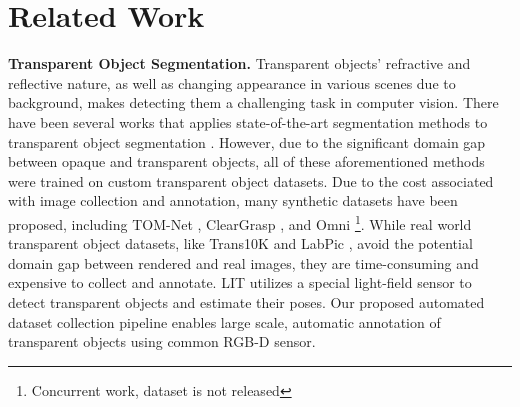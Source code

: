 \documentclass{article}
\begin{document}
\section{Related Work}
\textbf{Transparent Object Segmentation.} Transparent objects' refractive and reflective nature, as well as changing appearance in various scenes due to background, makes detecting them a challenging task in computer vision. There have been several works that applies state-of-the-art segmentation methods \citep{he2018mask,chen2017rethinking,carion2020endtoend} to transparent object segmentation \citep{LabPic, ClearGrasp, xie2021segmenting}. However, due to the significant domain gap between opaque and transparent objects, all of these aforementioned methods were trained on custom transparent object datasets. Due to the cost associated with image collection and annotation, many synthetic datasets have been proposed, including TOM-Net \citep{chen2018tomnet}, ClearGrasp \citep{ClearGrasp}, and Omni \citep{zhu2021rgbd}\footnote{Concurrent work, dataset is not released}. While real world transparent object datasets, like Trans10K \citep{xie2021segmenting} and LabPic \citep{LabPic}, avoid the potential domain gap between rendered and real images, they are time-consuming and expensive to collect and annotate. LIT \citep{zhou2020lit} utilizes a special light-field sensor to detect transparent objects and estimate their poses. Our proposed automated dataset collection pipeline enables large scale, automatic annotation of transparent objects using common RGB-D sensor. 




\end{document}
